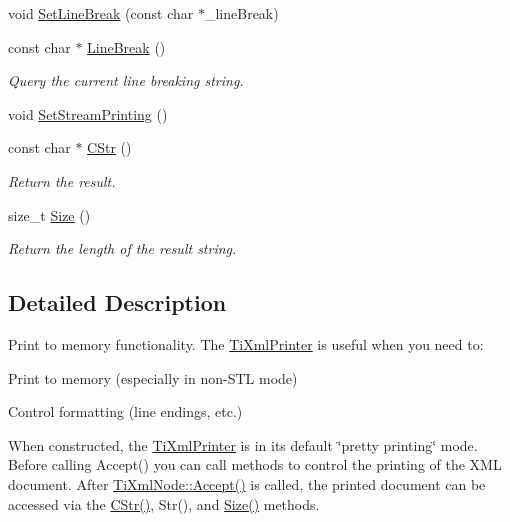 \begin{DoxyCompactItemize}
void \hyperlink{classTiXmlPrinter_a4be1e37e69e3858c59635aa947174fe6}{Set\+Line\+Break} (const char $\ast$\+\_\+line\+Break)
\item 
\mbox{\label{classTiXmlPrinter_a11f1b4804a460b175ec244eb5724d96d}} 
const char $\ast$ \hyperlink{classTiXmlPrinter_a11f1b4804a460b175ec244eb5724d96d}{Line\+Break} ()
\begin{DoxyCompactList}\small\item\em Query the current line breaking string. \end{DoxyCompactList}\item 
void \hyperlink{classTiXmlPrinter_ab23a90629e374cb1cadca090468bbd19}{Set\+Stream\+Printing} ()
\item 
\mbox{\label{classTiXmlPrinter_a859eede9597d3e0355b77757be48735e}} 
const char $\ast$ \hyperlink{classTiXmlPrinter_a859eede9597d3e0355b77757be48735e}{C\+Str} ()
\begin{DoxyCompactList}\small\item\em Return the result. \end{DoxyCompactList}\item 
\mbox{\label{classTiXmlPrinter_ad01375ae9199bd2f48252eaddce3039d}} 
size\+\_\+t \hyperlink{classTiXmlPrinter_ad01375ae9199bd2f48252eaddce3039d}{Size} ()
\begin{DoxyCompactList}\small\item\em Return the length of the result string. \end{DoxyCompactList}\end{DoxyCompactItemize}


\subsection{Detailed Description}
Print to memory functionality. The \hyperlink{classTiXmlPrinter}{Ti\+Xml\+Printer} is useful when you need to\+:


\begin{DoxyEnumerate}
\item Print to memory (especially in non-\/\+S\+TL mode)
\item Control formatting (line endings, etc.)
\end{DoxyEnumerate}

When constructed, the \hyperlink{classTiXmlPrinter}{Ti\+Xml\+Printer} is in its default \char`\"{}pretty printing\char`\"{} mode. Before calling Accept() you can call methods to control the printing of the X\+ML document. After \hyperlink{classTiXmlNode_acc0f88b7462c6cb73809d410a4f5bb86}{Ti\+Xml\+Node\+::\+Accept()} is called, the printed document can be accessed via the \hyperlink{classTiXmlPrinter_a859eede9597d3e0355b77757be48735e}{C\+Str()}, Str(), and \hyperlink{classTiXmlPrinter_ad01375ae9199bd2f48252eaddce3039d}{Size()} methods.

